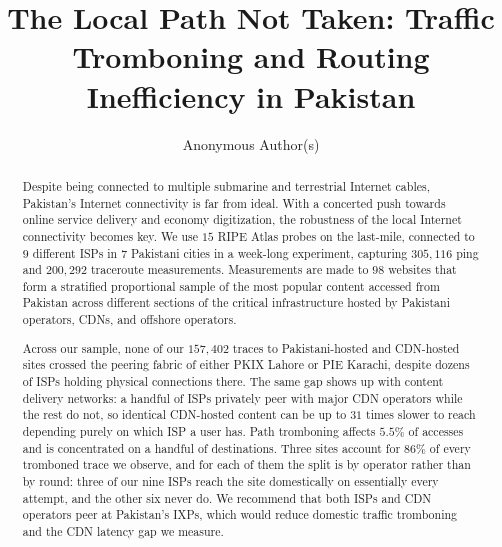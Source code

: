 \documentclass[sigconf,anonymous,10pt]{acmart}
\begin{document}
\title{The Local Path Not Taken: Traffic Tromboning and Routing Inefficiency in Pakistan}

\author{Anonymous Author(s)}

\renewcommand{\shortauthors}{Anonymous et al.}

\begin{abstract}
Despite being connected to multiple submarine and terrestrial Internet cables, Pakistan's Internet connectivity is far from ideal. With a concerted push towards online service delivery and economy digitization, the robustness of the local Internet connectivity becomes key. We use $15$ RIPE Atlas probes on the last-mile, connected to $9$ different ISPs in $7$ Pakistani cities in a week-long experiment, capturing $305,116$ ping and $200,292$ traceroute measurements. Measurements are made to $98$ websites that form a stratified proportional sample of the most popular content accessed from Pakistan across different sections of the critical infrastructure hosted by Pakistani operators, CDNs, and offshore operators.  

Across our sample, none of our $157{,}402$ traces to Pakistani-hosted and CDN-hosted sites crossed the peering fabric of either PKIX Lahore or PIE Karachi, despite dozens of ISPs holding physical connections there. The same gap shows up with content delivery networks: a handful of ISPs privately peer with major CDN operators while the rest do not, so identical CDN-hosted content can be up to $31$ times slower to reach depending purely on which ISP a user has. Path tromboning affects $5.5\%$ of accesses and is concentrated on a handful of destinations. Three sites account for $86\%$ of every tromboned trace we observe, and for each of them the split is by operator rather than by round: three of our nine ISPs reach the site domestically on essentially every attempt, and the other six never do. We recommend that both ISPs and CDN operators peer at Pakistan's IXPs, which would reduce domestic traffic tromboning and the CDN latency gap we measure.











\end{abstract}
\end{document}
